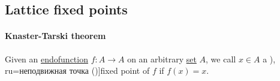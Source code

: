 \subsection{Lattice fixed points}\label{subsec:lattice_fixed_points}

\paragraph{Knaster-Tarski theorem}

\begin{definition}\label{def:fixed_point}
  Given an \hyperref[def:function/endofunction]{endofunction} \( f: A \to A \) on an arbitrary \hyperref[def:set]{set} \( A \), we call \( x \in A \) a \term[bg=неподвижна точка (\cite[138]{Боянов2008}), ru=неподвижная точка (\cite[23]{Зорич2019Том1})]{fixed point} of \( f \) if \( f(x) = x \).
\end{definition}

